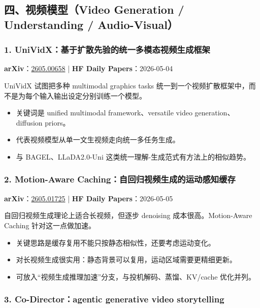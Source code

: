 \subsection{四、视频模型（Video Generation / Understanding / Audio-Visual）}

\subsubsection{1. UniVidX：基于扩散先验的统一多模态视频生成框架}

\textbf{arXiv}：\href{https://arxiv.org/abs/2605.00658}{2605.00658} | \textbf{HF Daily Papers}：2026-05-04

UniVidX 试图把多种 multimodal graphics tasks 统一到一个视频扩散框架中，而不是为每个输入输出设定分别训练一个模型。

\begin{itemize}[leftmargin=1.5em]
  \item 关键词是 unified multimodal framework、versatile video generation、diffusion priors。
  \item 代表视频模型从单一文生视频走向统一多任务生成。
  \item 与 BAGEL、LLaDA2.0-Uni 这类统一理解-生成范式有方法上的相似趋势。
\end{itemize}

\subsubsection{2. Motion-Aware Caching：自回归视频生成的运动感知缓存}

\textbf{arXiv}：\href{https://arxiv.org/abs/2605.01725}{2605.01725} | \textbf{HF Daily Papers}：2026-05-05

自回归视频生成理论上适合长视频，但逐步 denoising 成本很高。Motion-Aware Caching 针对这一点做加速。

\begin{itemize}[leftmargin=1.5em]
  \item 关键思路是缓存复用不能只按静态相似性，还要考虑运动变化。
  \item 对长视频生成很实用：静态背景可以复用，运动区域需要更精细更新。
  \item 可放入“视频生成推理加速”分支，与投机解码、蒸馏、KV/cache 优化并列。
\end{itemize}

\subsubsection{3. Co-Director：agentic generative video storytelling}

